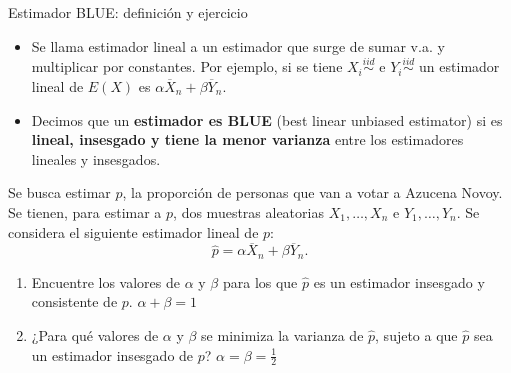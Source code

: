 \documentclass{beamer}
\theoremstyle{definition}
\begin{document}
\begin{frame}{\color{rosee} Estimador BLUE: definición y ejercicio}

\begin{itemize}
    \item Se llama estimador lineal a un estimador que surge de sumar v.a. y multiplicar por constantes. Por ejemplo, si se tiene $X_i\stackrel{iid}{\sim}$ e $Y_i\stackrel{iid}{\sim}$ un estimador lineal de $E(X)$ es $\alpha \overline{X}_n + \beta \overline{Y}_n$.
    
\item Decimos que un \textbf{estimador es BLUE} (best linear unbiased estimator) si es \textbf{lineal, insesgado y tiene la menor varianza} entre los estimadores lineales y insesgados.
\end{itemize}
Se busca estimar $p$, la proporción de personas que van a votar a Azucena Novoy. Se tienen, para estimar a $p$, dos muestras aleatorias $X_1,\dots , X_n$ e $Y_1, \dots , Y_n$. Se considera el siguiente estimador lineal de $p$:
$$\widehat{p} = \alpha \overline{X}_n + \beta \overline{Y}_n.$$

\begin{enumerate}
    \item Encuentre los valores de $\alpha$ y $\beta$ para los que $\widehat{p}$ es un estimador insesgado y consistente de $p$. \color{gray} $\alpha+\beta=1$ \color{black}\medskip
    \item ¿Para qué valores de $\alpha$ y $\beta$ se minimiza la varianza de $\widehat{p}$, sujeto a que $\widehat{p}$ sea un estimador insesgado de $p$? \color{gray} $\alpha=\beta=\frac{1}{2}$ \color{black} 
\end{enumerate}
\end{frame}
\end{document}
